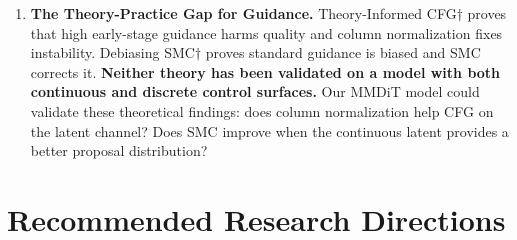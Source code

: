 \documentclass{article}
\begin{document}
\begin{enumerate}
    \item \textbf{The Theory-Practice Gap for Guidance.}
    Theory-Informed CFG$\dagger$ proves that high early-stage guidance harms quality and column normalization fixes instability. Debiasing SMC$\dagger$ proves standard guidance is biased and SMC corrects it. \textbf{Neither theory has been validated on a model with both continuous and discrete control surfaces.} Our MMDiT model could validate these theoretical findings: does column normalization help CFG on the latent channel? Does SMC improve when the continuous latent provides a better proposal distribution?
\end{enumerate}

\section{Recommended Research Directions}
\end{document}
